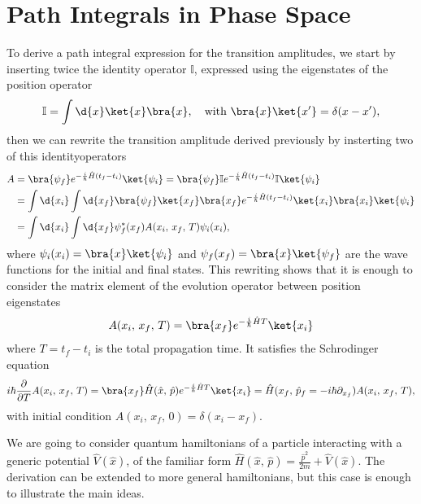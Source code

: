 \section{Path Integrals in Phase Space}

To derive a path integral expression for the transition amplitudes, we start by inserting twice the identity operator \(\mathbb{I}\), expressed using the eigenstates of the position operator
\[
    \mathbb{I} = \int \d{x} \ket{x} \bra{x}, \quad \text{with } \bra{x}\ket{x^{\prime}} = \delta(x-x^{\prime}),
\]
then we can rewrite the transition amplitude derived previously by insterting two of this identityoperators
\[
    \begin{aligned}
        A & = \bra{\psi_f} e^{-\frac{i}{\hbar} \hat{H} (t_f - t_i)} \ket{\psi_i} = \bra{\psi_f} \mathbb{I} e^{-\frac{i}{\hbar} \hat{H} (t_f - t_i)} \mathbb{I} \ket{\psi_i} \\
          & = \int \d{x_i} \int \d{x_f} \bra{\psi_f}\ket{x_f} \bra{x_f} e^{-\frac{i}{\hbar} \hat{H} (t_f - t_i)} \ket{x_i} \bra{x_i}\ket{\psi_i}                            \\
          & = \int \d{x_i} \int \d{x_f} \psi_f^*(x_f) A(x_i,\,x_f,\,T) \psi_i(x_i),
    \end{aligned}
\]
where \(\psi_i(x_i) = \bra{x}\ket{\psi_i}\) and \(\psi_f(x_f) = \bra{x}\ket{\psi_f}\) are the wave functions for the initial and final
states. This rewriting shows that it is enough to consider the matrix element of the evolution operator between position eigenstates
\[
    A(x_i,\,x_f,\,T) = \bra{x_f} e^{-\frac{i}{\hbar} \hat{H} T} \ket{x_i}
\]
where \(T = t_f - t_i\) is the total propagation time. It satisfies the Schrodinger equation
\[
    i\hbar \frac{\partial}{\partial T} A(x_i,\,x_f,\,T) = \bra{x_f} \hat{H}(\hat{x},\,\hat{p}) e^{-\frac{i}{\hbar} \hat{H} T} \ket{x_i} = \hat{H}(x_f,\,\hat{p}_f= -i\hbar \partial_{x_f}) A(x_i,\,x_f,\,T),
\]
with initial condition \(A(x_i,\,x_f,\,0) = \delta(x_i - x_f)\).

We are going to consider quantum hamiltonians of a particle interacting with a generic potential \(\hat{V}(\hat{x})\), of the familiar form \(\hat{H}(\hat{x} ,\,\hat{p}) = \frac{\hat{p}^2}{2m} + \hat{V}(\hat{x})\). The derivation can be extended to more general hamiltonians, but this case is enough to illustrate the main ideas.

